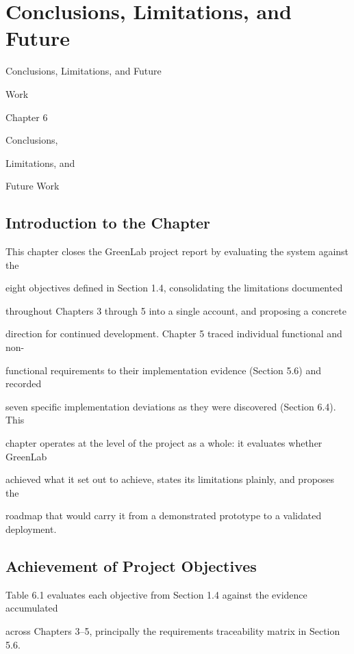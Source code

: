 \chapter{Conclusions, Limitations, and Future}
Conclusions, Limitations, and Future

Work

Chapter 6

Conclusions,

Limitations, and

Future Work


\section{Introduction to the Chapter}
This chapter closes the GreenLab project report by evaluating the system against the

eight objectives defined in Section 1.4, consolidating the limitations documented

throughout Chapters 3 through 5 into a single account, and proposing a concrete

direction for continued development. Chapter 5 traced individual functional and non-

functional requirements to their implementation evidence (Section 5.6) and recorded

seven specific implementation deviations as they were discovered (Section 6.4). This

chapter operates at the level of the project as a whole: it evaluates whether GreenLab

achieved what it set out to achieve, states its limitations plainly, and proposes the

roadmap that would carry it from a demonstrated prototype to a validated deployment.


\section{Achievement of Project Objectives}
Table 6.1 evaluates each objective from Section 1.4 against the evidence accumulated

across Chapters 3--5, principally the requirements traceability matrix in Section 5.6.

